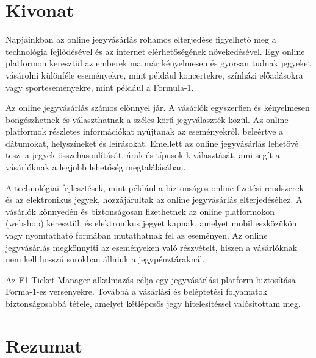 
\hungarianParagraph


\chapter*{Kivonat}

Napjainkban az online jegyvásárlás rohamos elterjedése figyelhető meg a technológia fejlődésével és az internet elérhetőségének növekedésével. Egy online platformon keresztül az emberek ma már kényelmesen és gyorsan tudnak jegyeket vásárolni különféle eseményekre, mint például koncertekre, színházi előadásokra vagy sporteseményekre, mint például a Formula-1.

Az online jegyvásárlás számos előnnyel jár. A vásárlók egyszerűen és kényelmesen böngészhetnek és választhatnak a széles körű jegyválaszték közül. Az online platformok részletes információkat nyújtanak az eseményekről, beleértve a dátumokat, helyszíneket és leírásokat. Emellett az online jegyvásárlás lehetővé teszi a jegyek összehasonlítását, árak és típusok kiválasztását, ami segít a vásárlóknak a legjobb lehetőség megtalálásában.

A technológiai fejlesztések, mint például a biztonságos online fizetési rendszerek és az elektronikus jegyek, hozzájárultak az online jegyvásárlás elterjedéséhez. A vásárlók könnyedén és biztonságosan fizethetnek az online platformokon (webshop) keresztül, és elektronikus jegyet kapnak, amelyet mobil eszközükön vagy nyomtatható formában mutathatnak fel az eseményen. Az online jegyvásárlás megkönnyíti az eseményeken való részvételt, hiszen a vásárlóknak nem kell hosszú sorokban állniuk a jegypénztáraknál. 

Az F1 Ticket Manager alkalmazás célja egy jegyvásárlási platform biztosítása Forma-1-es versenyekre. Továbbá a vásárlási és beléptetési folyamatok biztonságosabbá tétele, amelyet kétlépcsős jegy hitelesítéssel valósítottam meg.

\vfill
{}

\chapter*{Rezumat}

